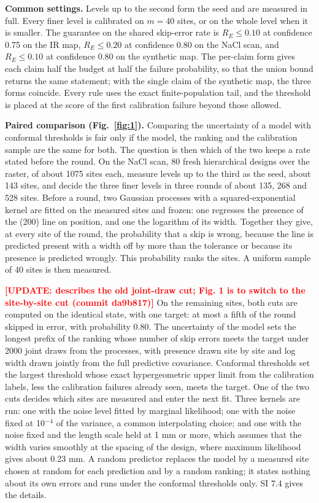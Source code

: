\documentclass{iopjournal}
\newcommand{\ask}[1]{\textcolor{red}{\textbf{[#1]}}}
\begin{document}
\textbf{Common settings.} Levels up to the second form the seed and are measured in full. Every finer level is calibrated on \(m = 40\) sites, or on the whole level when it is smaller. The guarantee on the shared skip-error rate is \(R_E \le 0.10\) at confidence 0.75 on the IR map, \(R_E \le 0.20\) at confidence 0.80 on the NaCl scan, and \(R_E \le 0.10\) at confidence 0.80 on the synthetic map. The per-claim form gives each claim half the budget at half the failure probability, so that the union bound returns the same statement; with the single claim of the synthetic map, the three forms coincide. Every rule uses the exact finite-population tail, and the threshold is placed at the score of the first calibration failure beyond those allowed.

\textbf{Paired comparison (Fig.~\ref{fig:1}).} Comparing the uncertainty of a model with conformal thresholds is fair only if the model, the ranking and the calibration sample are the same for both. The question is then which of the two keeps a rate stated before the round. On the NaCl scan, 80 fresh hierarchical designs over the raster, of about 1075 sites each, measure levels up to the third as the seed, about 143 sites, and decide the three finer levels in three rounds of about 135, 268 and 528 sites. Before a round, two Gaussian processes with a squared-exponential kernel are fitted on the measured sites and frozen: one regresses the presence of the (200) line on position, and one the logarithm of its width. Together they give, at every site of the round, the probability that a skip is wrong, because the line is predicted present with a width off by more than the tolerance or because its presence is predicted wrongly. This probability ranks the sites. A uniform sample of 40 sites is then measured.

\ask{UPDATE: describes the old joint-draw cut; Fig. 1 is to switch to the site-by-site cut (commit da9b817)} On the remaining sites, both cuts are computed on the identical state, with one target: at most a fifth of the round skipped in error, with probability 0.80. The uncertainty of the model sets the longest prefix of the ranking whose number of skip errors meets the target under 2000 joint draws from the processes, with presence drawn site by site and log width drawn jointly from the full predictive covariance. Conformal thresholds set the largest threshold whose exact hypergeometric upper limit from the calibration labels, less the calibration failures already seen, meets the target. One of the two cuts decides which sites are measured and enter the next fit. Three kernels are run: one with the noise level fitted by marginal likelihood; one with the noise fixed at 10\ensuremath{^{-}}\ensuremath{^{4}} of the variance, a common interpolating choice; and one with the noise fixed and the length scale held at 1 mm or more, which assumes that the width varies smoothly at the spacing of the design, where maximum likelihood gives about 0.23 mm. A random predictor replaces the model by a measured site chosen at random for each prediction and by a random ranking; it states nothing about its own errors and runs under the conformal thresholds only. SI 7.4 gives the details.
\end{document}
